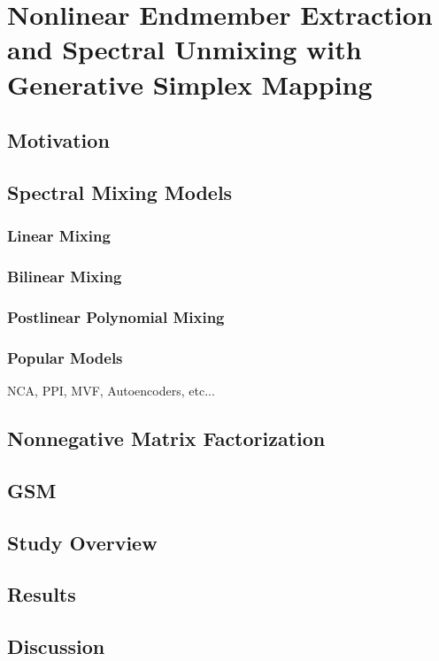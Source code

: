 \chapter{Nonlinear Endmember Extraction and Spectral Unmixing with Generative Simplex Mapping}\label{ch:robot-team-gsm}


\section{Motivation}

\section{Spectral Mixing Models}
\subsection{Linear Mixing}
\subsection{Bilinear Mixing}
\subsection{Postlinear Polynomial Mixing}
\subsection{Popular Models}
NCA, PPI, MVF, Autoencoders, etc...

\section{Nonnegative Matrix Factorization}

\section{GSM}

\section{Study Overview}

\section{Results}

\section{Discussion}

